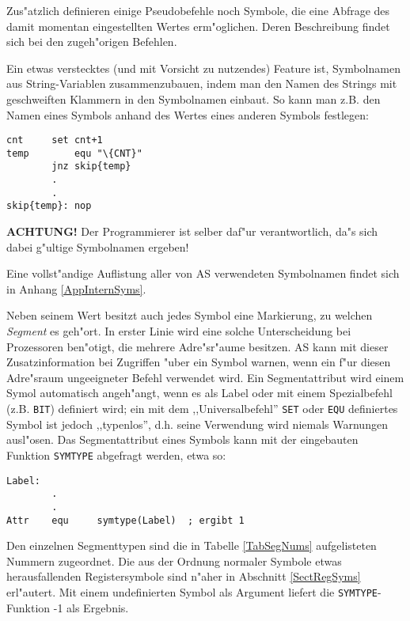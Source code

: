 \documentclass[12pt,a4paper,twoside]{report}
\newcommand{\bb}[1]{{\bf #1}}
\newcommand{\tty}[1]{{\tt #1}}
\begin{document}
Zus"atzlich definieren einige Pseudobefehle noch Symbole, die eine
Abfrage des damit momentan eingestellten Wertes erm"oglichen.  Deren
Beschreibung findet sich bei den zugeh"origen Befehlen.
\par
Ein etwas verstecktes (und mit Vorsicht zu nutzendes) Feature ist,
Symbolnamen aus String-Variablen zusammenzubauen, indem man den
Namen des Strings mit geschweiften Klammern in den Symbolnamen
einbaut.  So kann man z.B. den Namen eines Symbols anhand des
Wertes eines anderen Symbols festlegen:
\begin{verbatim}
cnt		set	cnt+1
temp		equ	"\{CNT}"
		jnz	skip{temp}
		.
		.
skip{temp}:	nop
\end{verbatim}
\bb{ACHTUNG!}  Der Programmierer ist selber daf"ur verantwortlich,
da"s sich dabei g"ultige Symbolnamen ergeben!
\par
Eine vollst"andige Auflistung aller von AS verwendeten Symbolnamen
findet sich in Anhang \ref{AppInternSyms}.
\par
Neben seinem Wert besitzt auch jedes Symbol eine Markierung, zu welchen
{\em Segment} es geh"ort.  In erster Linie wird eine solche Unterscheidung
bei Prozessoren ben"otigt, die mehrere Adre"sr"aume besitzen.  AS kann mit
dieser Zusatzinformation bei Zugriffen "uber ein Symbol warnen, wenn ein
f"ur diesen Adre"sraum ungeeigneter Befehl verwendet wird.  Ein
Segmentattribut wird einem Symol automatisch angeh"angt, wenn es als Label
oder mit einem Spezialbefehl (z.B. \tty{BIT}) definiert wird; ein mit
dem ,,Universalbefehl'' \tty{SET} oder \tty{EQU} definiertes Symbol ist
jedoch ,,typenlos'', d.h. seine Verwendung wird niemals Warnungen
ausl"osen.  Das Segmentattribut eines Symbols kann mit der eingebauten
Funktion \tty{SYMTYPE} abgefragt werden, etwa so:
\begin{verbatim}
Label:
        .
        .
Attr    equ     symtype(Label)  ; ergibt 1
\end{verbatim}
Den einzelnen Segmenttypen sind die in Tabelle \ref{TabSegNums}
aufgelisteten Nummern zugeordnet.  Die aus der Ordnung normaler Symbole
etwas herausfallenden Registersymbole sind n"aher in Abschnitt
\ref{SectRegSyms} erl"autert.  Mit einem undefinierten Symbol als Argument
liefert die \tty{SYMTYPE}-Funktion -1 als Ergebnis.
\end{document}
